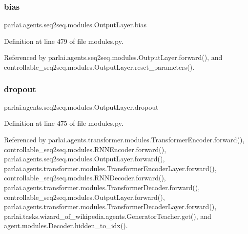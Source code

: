 \mbox{\label{classparlai_1_1agents_1_1seq2seq_1_1modules_1_1OutputLayer_af9588423b3853ca292927fc37a24a674}} 
\subsubsection{\texorpdfstring{bias}{bias}}
{\footnotesize\ttfamily parlai.\+agents.\+seq2seq.\+modules.\+Output\+Layer.\+bias}



Definition at line 479 of file modules.\+py.



Referenced by parlai.\+agents.\+seq2seq.\+modules.\+Output\+Layer.\+forward(), and controllable\+\_\+seq2seq.\+modules.\+Output\+Layer.\+reset\+\_\+parameters().

\mbox{\label{classparlai_1_1agents_1_1seq2seq_1_1modules_1_1OutputLayer_aa9bb2d06eae7ebeb2fc1d2d0a27e0c3b}} 
\subsubsection{\texorpdfstring{dropout}{dropout}}
{\footnotesize\ttfamily parlai.\+agents.\+seq2seq.\+modules.\+Output\+Layer.\+dropout}



Definition at line 475 of file modules.\+py.



Referenced by parlai.\+agents.\+transformer.\+modules.\+Transformer\+Encoder.\+forward(), controllable\+\_\+seq2seq.\+modules.\+R\+N\+N\+Encoder.\+forward(), parlai.\+agents.\+seq2seq.\+modules.\+Output\+Layer.\+forward(), parlai.\+agents.\+transformer.\+modules.\+Transformer\+Encoder\+Layer.\+forward(), controllable\+\_\+seq2seq.\+modules.\+R\+N\+N\+Decoder.\+forward(), parlai.\+agents.\+transformer.\+modules.\+Transformer\+Decoder.\+forward(), controllable\+\_\+seq2seq.\+modules.\+Output\+Layer.\+forward(), parlai.\+agents.\+transformer.\+modules.\+Transformer\+Decoder\+Layer.\+forward(), parlai.\+tasks.\+wizard\+\_\+of\+\_\+wikipedia.\+agents.\+Generator\+Teacher.\+get(), and agent.\+modules.\+Decoder.\+hidden\+\_\+to\+\_\+idx().

